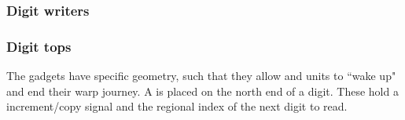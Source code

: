     \subsubsection{ Digit writers }


    \subsubsection{ Digit tops }
        The {\dtop} gadgets have specific geometry, such that they allow {\firstwarp} and
        {\secondwarp} units to ``wake up" and end their warp journey. A {\dtop} is placed on
        the north end of a digit. These hold a increment/copy signal and the regional index
        of the next digit to read.
        \vspace{1cm}

